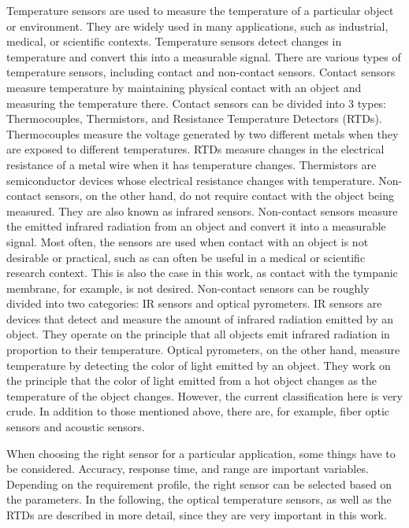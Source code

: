 Temperature sensors are used to measure the temperature of a particular object or environment.
They are widely used in many applications, such as industrial, medical, or scientific contexts.
Temperature sensors detect changes in temperature and convert this into a measurable signal.
There are various types of temperature sensors, including contact and non-contact sensors.
Contact sensors measure temperature by maintaining physical contact with an object and measuring the temperature there.
Contact sensors can be divided into 3 types: Thermocouples, Thermistors, and Resistance Temperature Detectors (RTDs). 
Thermocouples measure the voltage generated by two different metals when they are exposed to different temperatures.
RTDs measure changes in the electrical resistance of a metal wire when it has temperature changes.
Thermistors are semiconductor devices whose electrical resistance changes with temperature.
Non-contact sensors, on the other hand, do not require contact with the object being measured. They are also known as infrared sensors.
Non-contact sensors measure the emitted infrared radiation from an object and convert it into a measurable signal.
Most often, the sensors are used when contact with an object is not desirable or practical, such as can often be useful in a medical or scientific research context. 
This is also the case in this work, as contact with the tympanic membrane, for example, is not desired.
Non-contact sensors can be roughly divided into two categories: IR sensors and optical pyrometers.
IR sensors are devices that detect and measure the amount of infrared radiation emitted by an object. They operate on the principle that all objects emit infrared radiation in proportion to their temperature. 
Optical pyrometers, on the other hand, measure temperature by detecting the color of light emitted by an object. They work on the principle that the color of light emitted from a hot object changes as the temperature of the object changes.
However, the current classification here is very crude.
In addition to those mentioned above, there are, for example, fiber optic sensors and acoustic sensors.

When choosing the right sensor for a particular application, some things have to be considered.
Accuracy, response time, and range are important variables.
Depending on the requirement profile, the right sensor can be selected based on the parameters.
In the following, the optical temperature sensors, as well as the RTDs are described in more detail, since they are very important in this work.

